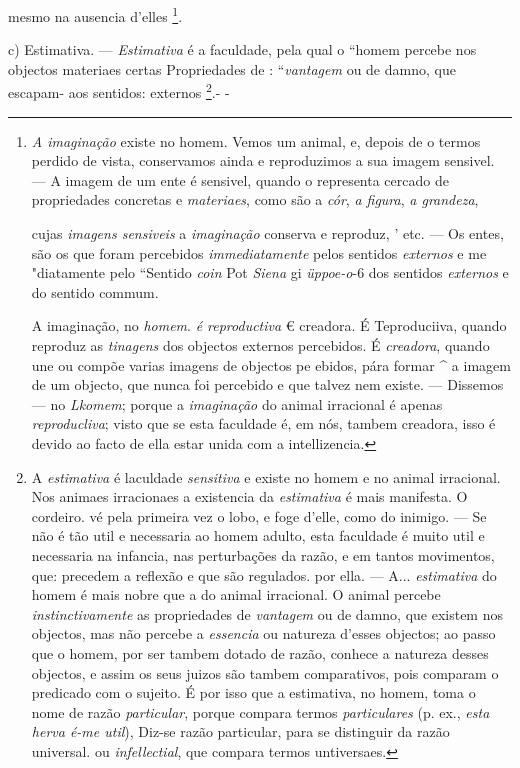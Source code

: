mesmo na ausencia d'elles \footnote{\emph{A imaginação} existe no homem. Vemos um animal, e, depois de o termos perdido de vista, conservamos ainda e reproduzimos a sua imagem sensivel. --- A imagem de um ente é sensivel, quando o representa cercado de propriedades concretas e \emph{materiaes}, como são a \emph{cór}, \emph{a figura}, \emph{a grandeza},\par cujas \emph{imagens sensiveis} a \emph{imaginação} conserva e reproduz, ' etc. --- Os entes, são os que foram percebidos \emph{immediatamente} pelos sentidos \emph{externos} e me "diatamente pelo “Sentido \emph{coin} Pot \emph{Siena} gi \emph{üppoe-o}-6 dos sentidos \emph{externos} e do sentido commum.\par A imaginação, no \emph{homem}. \emph{é reproductiva} € creadora. É Teproduciiva, quando reproduz as \emph{tinagens} dos objectos externos percebidos. É \emph{creadora}, quando une ou compõe varias imagens de objectos pe ebidos, pára formar \textasciicircum{} a imagem de um objecto, que nunca foi percebido e que talvez nem existe. --- Dissemos --- no \emph{Lkomem}; porque a \emph{imaginação} do animal irracional é apenas \emph{reproducliva}; visto que se esta faculdade é, em nós, tambem creadora, isso é devido ao facto de ella estar unida com a intellizencia.}.

c) Estimativa. --- \emph{Estimativa} é a faculdade, pela qual o “homem percebe nos objectos materiaes certas Propriedades de : “\emph{vantagem} ou de damno, que escapam- aos sentidos: externos \footnote{A \emph{estimativa} é laculdade \emph{sensitiva} e existe no homem e no animal irracional. Nos animaes irracionaes a existencia da \emph{estimativa} é mais manifesta. O cordeiro. vé pela primeira vez o lobo, e foge d'elle, como do inimigo. --- Se não é tão util e necessaria ao homem adulto, esta faculdade é muito util e necessaria na infancia, nas perturbações da razão, e em tantos movimentos, que: precedem a reflexão e que são regulados. por ella. --- A... \emph{estimativa} do homem é mais nobre que a do animal irracional. O animal percebe \emph{instinctivamente} as propriedades de \emph{vantagem} ou de damno, que existem nos objectos, mas não percebe a \emph{essencia} ou natureza d'esses objectos; ao passo que o homem, por ser tambem dotado de razão, conhece a natureza desses objectos, e assim os seus juizos são tambem comparativos, pois comparam o predicado com o sujeito. É por isso que a estimativa, no homem, toma o nome de razão \emph{particular}, porque compara termos \emph{particulares} (p. ex., \emph{esta herva é-me util}), Diz-se razão particular, para se distinguir da razão universal. ou \emph{infellectial}, que compara termos untiversaes.}.- -

